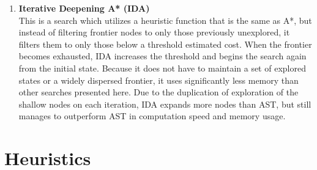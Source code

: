\documentclass{article}
\newcommand\bitem[1]{\item{\bfseries #1}\\}
\begin{document}
\begin{enumerate}
		\bitem{Iterative Deepening A* (IDA)}
		    This is a search which utilizes a heuristic function that is the same as A*, but instead of filtering frontier nodes to only those previously unexplored, it filters them to only those below a threshold estimated cost.  When the frontier becomes exhausted, IDA increases the threshold and begins the search again from the initial state.  Because it does not have to maintain a set of explored states or a widely dispersed frontier, it uses significantly less memory than other searches presented here. Due to the duplication of exploration of the shallow nodes on each iteration, IDA expands more nodes than AST, but still manages to outperform AST in computation speed and memory usage. 
	\end{enumerate}
	\newpage
	\section{Heuristics}
\end{document}
